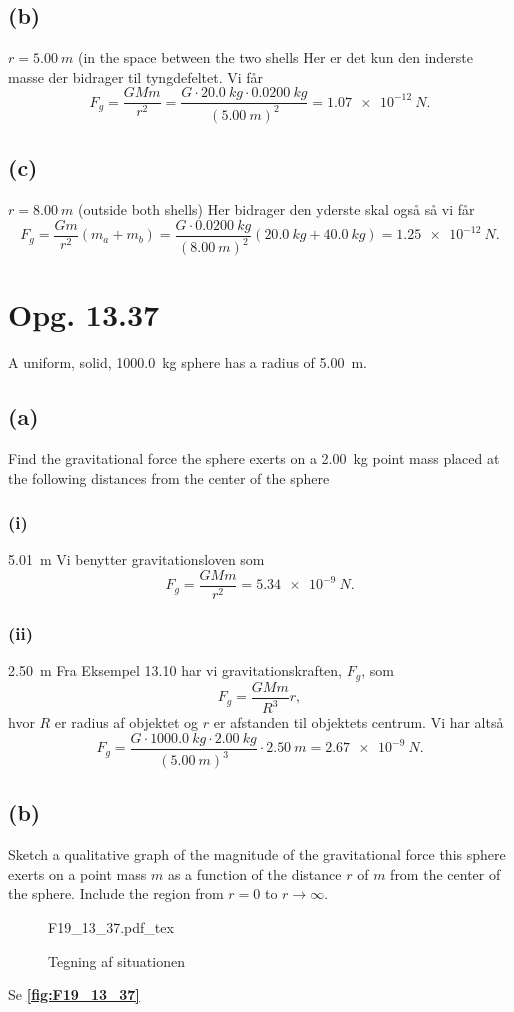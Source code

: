 \documentclass[12pt]{article}
\newcommand{\incfig}[2][1]{%
  \def\svgwidth{#1\columnwidth}
  {#2.pdf_tex}
}
\theoremstyle{definition}
\begin{document}
\subsection*{(b)}
$r = \qty{5,00}{m}$ (in the space between the two shells
\bigbreak
Her er det kun den inderste masse der bidrager til tyngdefeltet. Vi får
\[ 
F_g = \frac{GMm}{r^2} = \frac{G\cdot \qty{20,0}{kg} \cdot \qty{0,0200}{kg}}{(\qty{5,00}{m} )^2} = \qty{1,07e-12}{N}  
.\]


\subsection*{(c)}
$r = \qty{8,00}{m}$ (outside both shells)
\bigbreak
Her bidrager den yderste skal også så vi får
\[ 
F_g = \frac{Gm}{r^2}(m_a + m_b) = \frac{G \cdot \qty{0,0200}{kg}}{(\qty{8,00}{m})^2}(\qty{20,0}{kg} + \qty{40,0}{kg}) = \qty{1,25e-12}{N} 
.\]


\section*{Opg. 13.37}
A uniform, solid, \qty{1000,0}{kg} sphere has a radius of \qty{5,00}{m}.

\subsection*{(a)}
Find the gravitational force the sphere exerts on a \qty{2,00}{kg} point mass placed at the following distances from the center of the sphere

\subsubsection*{(i)}
\qty{5,01}{m} 
\bigbreak
Vi benytter gravitationsloven som
\[ 
F_g = \frac{GMm}{r^2} = \qty{5,34e-9}{N} 
.\]


\subsubsection*{(ii)}
\qty{2,50}{m} 
\bigbreak
Fra Eksempel 13.10 har vi gravitationskraften, $F_g$, som
\[ 
F_g = \frac{GMm}{R^3}r
,\]
hvor $R$ er radius af objektet og $r$ er afstanden til objektets centrum. Vi har altså
\[ 
F_g = \frac{G \cdot \qty{1000,0}{kg} \cdot \qty{2,00}{kg} }{(\qty{5,00}{m})^3} \cdot \qty{2,50}{m} = \qty{2,67e-9}{N}  
.\]


\subsection*{(b)}
Sketch a qualitative graph of the magnitude of the gravitational force this sphere exerts on a point mass $m$ as a function of the distance $r$ of $m$ from the center of the sphere. Include the region from $r = 0$ to $r \to \infty$.
\bigbreak
\begin{figure}[ht]
  \centering
  \incfig[0.8]{F19_13_37}
  \caption{Tegning af situationen}
  \label{fig:F19_13_37}
\end{figure}
Se \textbf{\autoref{fig:F19_13_37}}
\end{document}
